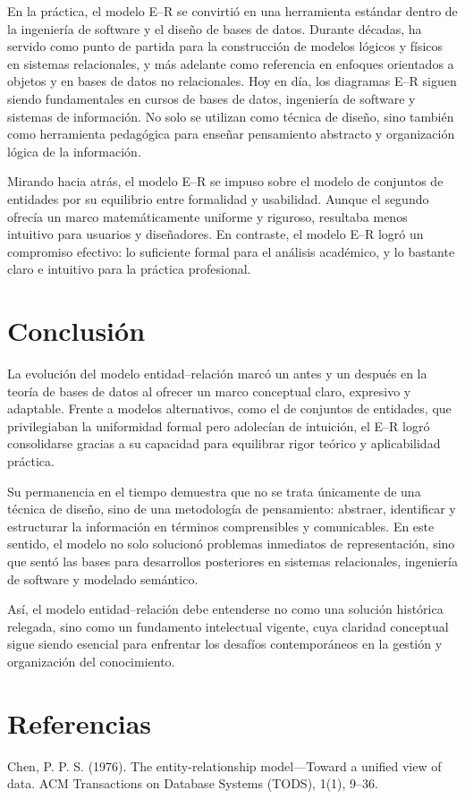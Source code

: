 \documentclass{article}
\begin{document}
En la práctica, el modelo E–R se convirtió en una herramienta estándar dentro de la ingeniería de software y el diseño de bases de datos. Durante décadas, ha servido como punto de partida para la construcción de modelos lógicos y físicos en sistemas relacionales, y más adelante como referencia en enfoques orientados a objetos y en bases de datos no relacionales. Hoy en día, los diagramas E–R siguen siendo fundamentales en cursos de bases de datos, ingeniería de software y sistemas de información. No solo se utilizan como técnica de diseño, sino también como herramienta pedagógica para enseñar pensamiento abstracto y organización lógica de la información.

Mirando hacia atrás, el modelo E–R se impuso sobre el modelo de conjuntos de entidades por su equilibrio entre formalidad y usabilidad. Aunque el segundo ofrecía un marco matemáticamente uniforme y riguroso, resultaba menos intuitivo para usuarios y diseñadores. En contraste, el modelo E–R logró un compromiso efectivo: lo suficiente formal para el análisis académico, y lo bastante claro e intuitivo para la práctica profesional.


\section*{Conclusión}

La evolución del modelo entidad–relación marcó un antes y un después en la teoría de bases de datos al ofrecer un marco conceptual claro, expresivo y adaptable. Frente a modelos alternativos, como el de conjuntos de entidades, que privilegiaban la uniformidad formal pero adolecían de intuición, el E–R logró consolidarse gracias a su capacidad para equilibrar rigor teórico y aplicabilidad práctica.

Su permanencia en el tiempo demuestra que no se trata únicamente de una técnica de diseño, sino de una metodología de pensamiento: abstraer, identificar y estructurar la información en términos comprensibles y comunicables. En este sentido, el modelo no solo solucionó problemas inmediatos de representación, sino que sentó las bases para desarrollos posteriores en sistemas relacionales, ingeniería de software y modelado semántico.

Así, el modelo entidad–relación debe entenderse no como una solución histórica relegada, sino como un fundamento intelectual vigente, cuya claridad conceptual sigue siendo esencial para enfrentar los desafíos contemporáneos en la gestión y organización del conocimiento.

\section*{Referencias}
Chen, P. P. S. (1976). The entity-relationship model—Toward a unified view of data. ACM Transactions on Database Systems (TODS), 1(1), 9–36.
\end{document}
